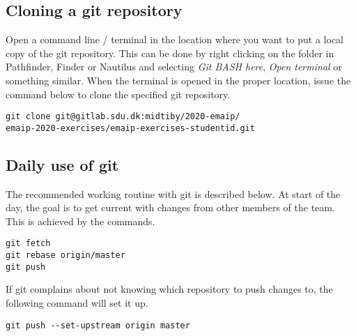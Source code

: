 \subsection{Cloning a git repository}

Open a command line / terminal in the location where you
want to put a local copy of the git repository.
This can be done by right clicking on the folder in 
Pathfinder, Finder or Nautilus and selecting 
\emph{Git BASH here}, \emph{Open terminal} or something similar.
When the terminal is opened in the proper location, issue the 
command below to clone the specified git repository.
\begin{verbatim}
git clone git@gitlab.sdu.dk:midtiby/2020-emaip/
emaip-2020-exercises/emaip-exercises-studentid.git

\end{verbatim}


\subsection{Daily use of git}

The recommended working routine with git is 
described below.
At start of the day, the goal is to get current
with changes from other members of the team.
This is achieved by the commands.
\begin{verbatim}
git fetch
git rebase origin/master
git push
\end{verbatim}
If git complains about not knowing which repository to push
changes to, the following command will
set it up.

\begin{verbatim}
git push --set-upstream origin master
\end{verbatim}

 